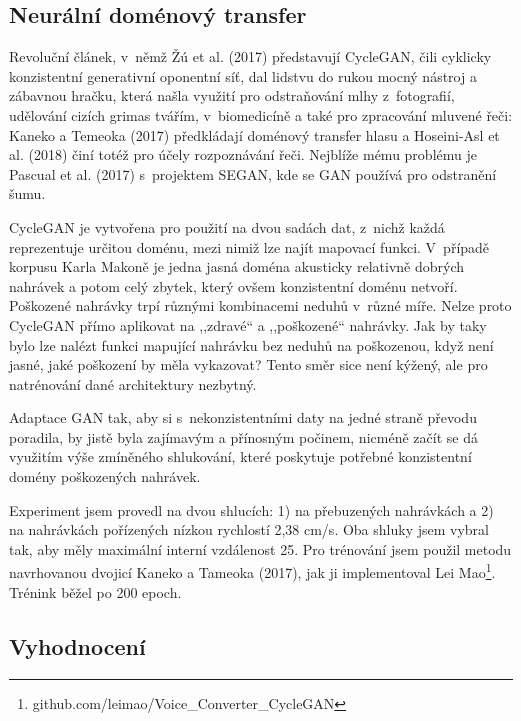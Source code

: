 \subsection{Neurální doménový transfer}

Revoluční článek\cite{cyclegan}, v~němž Žú et al. (2017) představují CycleGAN, čili
cyklicky konzistentní generativní oponentní síť, dal lidstvu do rukou mocný
nástroj a zábavnou hračku, která našla využití pro odstraňování mlhy
z~fotografií\cite{Engin_2018_CVPR_Workshops}, udělování cizích grimas
tvářím\cite{jin2017faceoff}, v~biomedicíně\cite{yang2018biogan} a také pro
zpracování mluvené řeči: Kaneko a Temeoka (2017)\cite{kaneko2017parallel} předkládají
doménový transfer hlasu a Hoseini-Asl et al. (2018)\cite{hosseini2018malevoicegan} činí
totéž pro účely rozpoznávání řeči. Nejblíže mému problému je Pascual et al. (2017)
s~projektem SEGAN\cite{pascual2017segan}, kde se GAN používá pro odstranění
šumu.

CycleGAN je vytvořena pro použití na dvou sadách dat, z~nichž každá reprezentuje
určitou doménu, mezi nimiž lze najít mapovací funkci. V~případě korpusu Karla
Makoně je jedna jasná doména akusticky relativně dobrých nahrávek a potom celý zbytek,
který ovšem konzistentní doménu netvoří. Poškozené nahrávky trpí různými
kombinacemi neduhů v~různé míře. Nelze proto CycleGAN přímo aplikovat na
,,zdravé`` a ,,poškozené`` nahrávky. Jak by taky bylo lze nalézt funkci mapující
nahrávku bez neduhů na poškozenou, když není jasné, jaké poškození by měla
vykazovat? Tento směr sice není kýžený, ale pro natrénování dané architektury
nezbytný.

Adaptace GAN tak, aby si s~nekonzistentními daty na jedné straně převodu
poradila, by jistě byla zajímavým a přínosným počinem, nicméně začít se dá
využitím výše zmíněného shlukování, které poskytuje potřebné konzistentní
domény poškozených nahrávek.

Experiment jsem provedl na dvou shlucích: 1) na přebuzených nahrávkách a 2) na
nahrávkách pořízených nízkou rychlostí 2,38 cm/s. Oba shluky jsem vybral tak, aby
měly maximální interní vzdálenost 25. Pro trénování jsem použil metodu
navrhovanou dvojicí Kaneko a Tameoka (2017)\cite{kaneko2017parallel}, jak ji
implementoval Lei Mao\footnote{github.com/leimao/Voice\_Converter\_CycleGAN}.
Trénink běžel po 200 epoch.

\subsection{Vyhodnocení}
\label{sec:akustika:vyhodnoceni}

